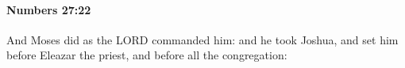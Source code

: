 
		\paragraph{Numbers 27:22} %
			\label{NUMBERS-27-22}

			And Moses did as the LORD commanded him: and he took Joshua, and set him before Eleazar the priest, and before all the congregation:


